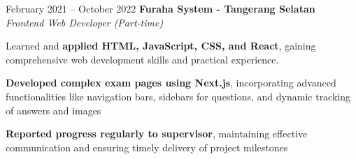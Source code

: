 \documentclass[../main.tex]{subfiles}
\begin{document}
\vspace{0.4 cm}

\begin{twocolentry}{
		February 2021 – October 2022}
	\textbf{Furaha System \color{Gray} - Tangerang Selatan}\\
	\textit{Frontend Web Developer (Part-time)}
\end{twocolentry}

\vspace{0.10 cm}
\begin{onecolentry}
	\begin{highlights}
		\item Learned and \textbf{applied HTML, JavaScript, CSS, and React}, gaining comprehensive web development skills and practical experience.
		\item \textbf{Developed complex exam pages using Next.js}, incorporating advanced functionalities like navigation bars, sidebars for questions, and dynamic tracking of answers and images
		\item \textbf{Reported progress regularly to supervisor}, maintaining effective communication and ensuring timely delivery of project milestones
	\end{highlights}
\end{onecolentry}
\end{document}

